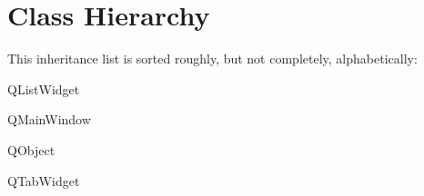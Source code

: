 \section{Class Hierarchy}
This inheritance list is sorted roughly, but not completely, alphabetically\+:\begin{DoxyCompactList}
\item {}
\item {}
\item Q\+List\+Widget\begin{DoxyCompactList}
\item {}
\end{DoxyCompactList}
\item Q\+Main\+Window\begin{DoxyCompactList}
\item {}
\end{DoxyCompactList}
\item Q\+Object\begin{DoxyCompactList}
\item {}
\end{DoxyCompactList}
\item Q\+Tab\+Widget\begin{DoxyCompactList}
\item {}
\end{DoxyCompactList}
\item {}
\end{DoxyCompactList}
